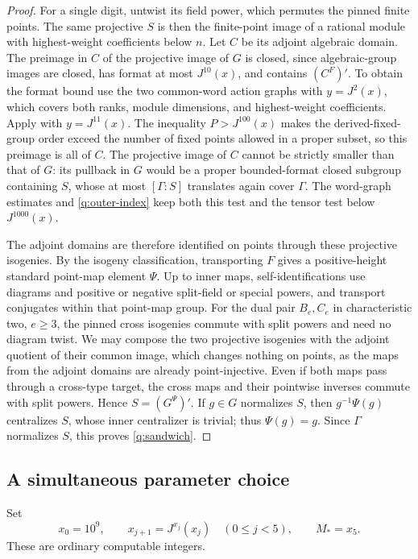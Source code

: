 \begin{proof}
For a single digit, untwist its field power, which permutes the pinned
finite points.  The same projective $S$ is then the finite-point image of
a rational module with highest-weight coefficients below $n$.  Let $C$
be its adjoint algebraic domain.  The preimage in $C$ of the projective
image of $G$ is closed, since algebraic-group images are closed, has
format at most $J^{10}(x)$, and contains $(C^F)'$.  To obtain the format
bound use the two common-word action graphs with $y=J^2(x)$, which
covers both ranks, module dimensions, and highest-weight coefficients.
Apply  with $y=J^{11}(x)$.  The inequality
$P>J^{100}(x)$ makes the derived-fixed-group order exceed the number
of fixed points allowed in a proper subset, so this preimage is all of
$C$.  The projective image of $C$ cannot be strictly smaller than that
of $G$: its pullback in $G$ would be a proper bounded-format closed
subgroup containing $S$, whose at most $[\Gamma:S]$ translates again
cover $\Gamma$.  The word-graph estimates and \eqref{q:outer-index}
keep both this test and the tensor test below $J^{1000}(x)$.

The adjoint domains are therefore identified on points through these
projective isogenies.  By the isogeny classification, transporting $F$
gives a positive-height standard point-map element $\Psi$.  Up to
inner maps, self-identifications use diagrams and positive or negative
split-field or special powers, and transport conjugates within that
point-map group.  For the dual pair $B_e,C_e$ in characteristic two,
$e\ge3$, the pinned cross isogenies commute with split powers and need
no diagram twist.  We may compose the two projective isogenies with the
adjoint quotient of their common image, which changes nothing on points,
as the maps from the adjoint domains are already point-injective.  Even
if both maps pass through a cross-type target, the cross maps and their
pointwise inverses commute with split powers.  Hence $S=(G^\Psi)'$.
If $g\in G$ normalizes $S$, then $g^{-1}\Psi(g)$ centralizes $S$,
whose inner centralizer is trivial; thus $\Psi(g)=g$.  Since $\Gamma$
normalizes $S$, this proves \eqref{q:sandwich}.
\end{proof}

\subsection{A simultaneous parameter choice}

\begin{definition}\label{q:ceiling-sequence}
Set
\begin{equation}\label{q:x-sequence}
 x_0=10^9,\qquad x_{j+1}=J^{x_j}(x_j)\quad(0\le j<5),
 \qquad M_*=x_5.
\end{equation}
These are ordinary computable integers.
\end{definition}

